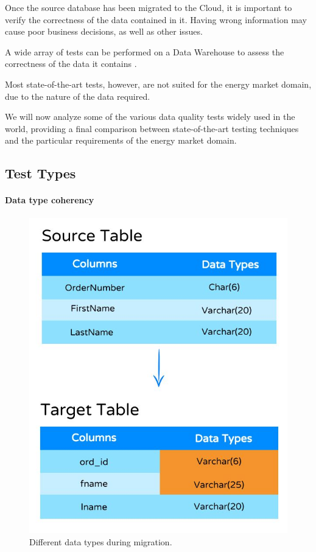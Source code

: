 
Once the source database has been migrated to the Cloud, it is important to verify the correctness of the data contained in it.
Having wrong information may cause poor business decisions, as well as other issues.

A wide array of tests can be performed on a Data Warehouse to assess the correctness of the data it contains \cite{bib:related_work:tests:tests1, bib:related_work:tests:tests2}.

Most state-of-the-art tests, however, are not suited for the energy market domain, due to the nature of the data required.

We will now analyze some of the various data quality tests widely used in the world, providing a final comparison between state-of-the-art testing techniques and the particular requirements of the energy market domain.

\subsection{Test Types}
    \paragraph{Data type coherency}
        \begin{figure}
            \centering
            \includegraphics[width=.5\textwidth]{res/relatedwork/data_type.jpg}
            \caption{Different data types during migration.}
            \label{fig:related:tests:data_type}
        \end{figure}
        
